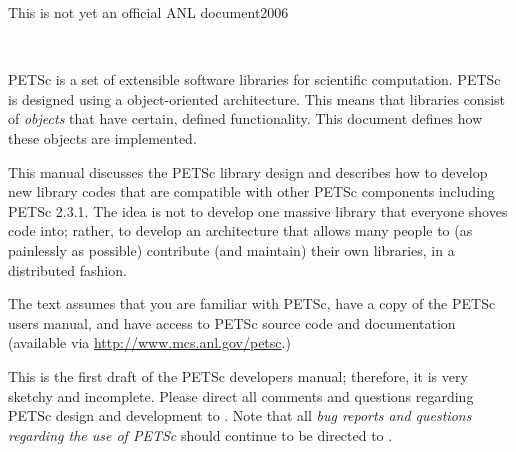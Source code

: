 \documentclass[twoside,12pt]{../sty/report_petsc}
\begin{document}
{\Large This is not yet an official ANL document}{2006}

\newpage

\hbox{ }

\vspace{1in}
\date{\today}

\newpage



\medskip \medskip


%
%

\medskip \medskip
PETSc is 
a set of extensible software libraries for scientific computation.
PETSc is designed using a object-oriented
architecture. This means that libraries consist of {\em objects} that
have certain, defined functionality. This document defines how these
objects are implemented.

This manual discusses the PETSc library design and describes
how to develop new library codes that are compatible with other PETSc components 
including PETSc 2.3.1.
The idea is not to develop one massive library that everyone shoves code 
into; rather, to develop an architecture that allows many people
to (as painlessly as possible) contribute (and maintain) their own libraries,
in a distributed fashion.

The text assumes
that you are familiar with PETSc, have a copy of the PETSc users
manual, and have access to PETSc source code and documentation
(available via \href{http://www.mcs.anl.gov/petsc}{http://www.mcs.anl.gov/petsc}.)


\vspace{1cm}

This is the first draft of the PETSc developers manual;
therefore, it is very sketchy and incomplete. Please
direct all comments and questions regarding PETSc design and
development to .  Note that all {\em
bug reports and questions regarding the use of PETSc} should continue
to be directed to .

%
%
\end{document}
